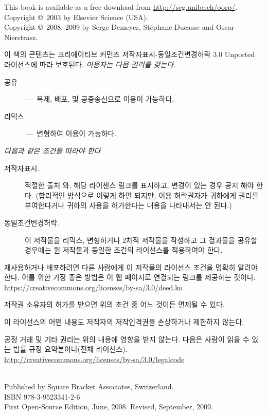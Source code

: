 \documentclass[a4paper,10pt,twoside]{book}
\begin{document}
\begin{footnotesize}
\setlength{\parindent}{0pt}
This book is available as a free download from \url{http://scg.unibe.ch/oorp/}.\\[1cm]

Copyright \copyright~2003 by Elsevier Science (USA).\\
Copyright \copyright~2008, 2009 by Serge Demeyer, St\'ephane Ducasse and Oscar Nierstrasz.

이 책의 콘텐츠는 크리에이티브 커먼즈 저작자표시-동일조건변경허락 3.0 Unported 라이선스에 따라 보호된다.
\emph{이용자는 다음 권리를 갖는다.}
\begin{description}
  \item[공유] \,---\, 복제, 배포, 및 공중송신으로 이용이 가능하다.
  \item[리믹스] \,---\, 변형하여 이용이 가능하다.
\end{description}
\emph{다음과 같은 조건을 따라야 한다}
\begin{description}
  \item[저작자표시.] 적절한 출처 와, 해당 라이센스 링크를 표시하고, 변경이 있는 경우 공지 해야 한다. (합리적인 방식으로 이렇게 하면 되지만, 이용 허락권자가 귀하에게 권리를 부여한다거나 귀하의 사용을 허가한다는 내용을 나타내서는 안 된다.)
  \item[동일조건변경허락.] 이 저작물을 리믹스, 변형하거나 2차적 저작물을 작성하고 그 결과물을 공유할 경우에는 원 저작물과 동일한 조건의 라이선스를 적용하여야 한다.
\end{description}
\begin{bulletlist}
  \item 재사용하거나 배포하려면 다른 사람에게 이 저작물의 라이선스 조건을 명확히 알려야 한다. 이를 위한 가장 좋은 방법은 이 웹 페이지로 연결되는 링크를 제공하는 것이다.
  \url{https://creativecommons.org/licenses/by-sa/3.0/deed.ko}
  \item 저작권 소유자의 허가를 받으면 위의 조건 중 어느 것이든 면제될 수 있다.
  \item 이 라이선스의 어떤 내용도 저작자의 저작인격권을 손상하거나 제한하지 않는다.
\end{bulletlist}
\quad
\parbox{\textwidth-2cm-1em}{
	공정 거래 및 기타 권리는 위의 내용에 영향을 받지 않는다.
	다음은 사람이 읽을 수 있는 법률 규정 요약본이다(전체 라이선스).\\
	\url{http://creativecommons.org/licenses/by-sa/3.0/legalcode}}\\[1cm]
Published by Square Bracket Associates, Switzerland. \sba\\
ISBN 978-3-9523341-2-6\\
First Open-Source Edition, June, 2008. Revised, September, 2009.
\end{footnotesize}
\end{document}
